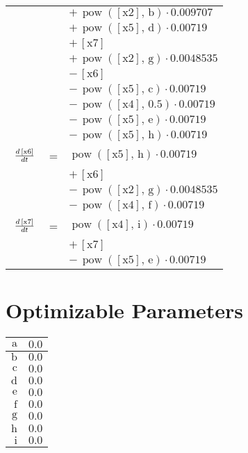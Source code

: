\documentclass{article}
\begin{document}
\begin{longtable}{lll}
 & & $ + \, \operatorname{pow}\left(\left[\mathrm{x2}\right],\,\mathrm{b}\right) \cdot 0.009707 $\\
 & & $ + \, \operatorname{pow}\left(\left[\mathrm{x5}\right],\,\mathrm{d}\right) \cdot 0.00719 $\\
 & & $ + \, \left[\mathrm{x7}\right] $\\
 & & $ + \, \operatorname{pow}\left(\left[\mathrm{x2}\right],\,\mathrm{g}\right) \cdot 0.0048535 $\\
 & & $ - \, \left[\mathrm{x6}\right] $\\
 & & $ - \, \operatorname{pow}\left(\left[\mathrm{x5}\right],\,\mathrm{c}\right) \cdot 0.00719 $\\
 & & $ - \, \operatorname{pow}\left(\left[\mathrm{x4}\right],\,0.5\right) \cdot 0.00719 $\\
 & & $ - \, \operatorname{pow}\left(\left[\mathrm{x5}\right],\,\mathrm{e}\right) \cdot 0.00719 $\\
 & & $ - \, \operatorname{pow}\left(\left[\mathrm{x5}\right],\,\mathrm{h}\right) \cdot 0.00719 $\\[5mm]
$ \tabfrac{d\,\left[\mathrm{x6}\right]}{dt} $ &=& $ \operatorname{pow}\left(\left[\mathrm{x5}\right],\,\mathrm{h}\right) \cdot 0.00719 $\\
 & & $ + \, \left[\mathrm{x6}\right] $\\
 & & $ - \, \operatorname{pow}\left(\left[\mathrm{x2}\right],\,\mathrm{g}\right) \cdot 0.0048535 $\\
 & & $ - \, \operatorname{pow}\left(\left[\mathrm{x4}\right],\,\mathrm{f}\right) \cdot 0.00719 $\\[5mm]
$ \tabfrac{d\,\left[\mathrm{x7}\right]}{dt} $ &=& $ \operatorname{pow}\left(\left[\mathrm{x4}\right],\,\mathrm{i}\right) \cdot 0.00719 $\\
 & & $ + \, \left[\mathrm{x7}\right] $\\
 & & $ - \, \operatorname{pow}\left(\left[\mathrm{x5}\right],\,\mathrm{e}\right) \cdot 0.00719 $\\[5mm]
\end{longtable}
\section*{Optimizable Parameters}
\begin{longtable}{|r|l|}
\hline
$\mathrm{a}$& $0.0$\\
\hline
$\mathrm{b}$& $0.0$\\
\hline
$\mathrm{c}$& $0.0$\\
\hline
$\mathrm{d}$& $0.0$\\
\hline
$\mathrm{e}$& $0.0$\\
\hline
$\mathrm{f}$& $0.0$\\
\hline
$\mathrm{g}$& $0.0$\\
\hline
$\mathrm{h}$& $0.0$\\
\hline
$\mathrm{i}$& $0.0$\\
\hline
\end{longtable}
\end{document}
